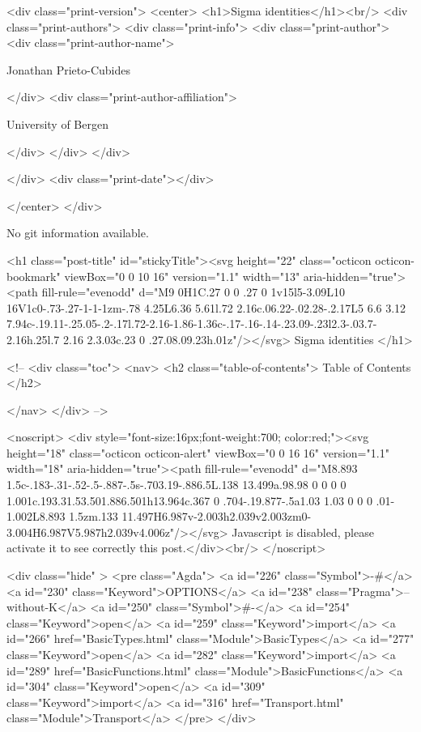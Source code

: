   <div class="print-version">
    <center>
      <h1>Sigma identities</h1><br/>
        <div class="print-authors">
          <div class="print-info">
            <div class="print-author">
              <div class="print-author-name">
                
                  Jonathan Prieto-Cubides
                
              </div>
              <div class="print-author-affiliation">
                
                  University of Bergen
                
                </div>
            </div>
          </div>
          
          
        </div>
        <div class="print-date"></div>
        
        
    </center>
  </div>

  
  No git information available.
  
  <h1 class="post-title" id="stickyTitle"><svg height="22" class="octicon octicon-bookmark" viewBox="0 0 10 16" version="1.1" width="13" aria-hidden="true"><path fill-rule="evenodd" d="M9 0H1C.27 0 0 .27 0 1v15l5-3.09L10 16V1c0-.73-.27-1-1-1zm-.78 4.25L6.36 5.61l.72 2.16c.06.22-.02.28-.2.17L5 6.6 3.12 7.94c-.19.11-.25.05-.2-.17l.72-2.16-1.86-1.36c-.17-.16-.14-.23.09-.23l2.3-.03.7-2.16h.25l.7 2.16 2.3.03c.23 0 .27.08.09.23h.01z"/></svg> Sigma identities
  </h1>

  <!-- 
  <div class="toc">
    <nav>
    <h2 class="table-of-contents"> Table of Contents </h2>
      

    </nav>
  </div>
   -->

  <noscript>
  <div style="font-size:16px;font-weight:700; color:red;"><svg height="18" class="octicon octicon-alert" viewBox="0 0 16 16" version="1.1" width="18" aria-hidden="true"><path fill-rule="evenodd" d="M8.893 1.5c-.183-.31-.52-.5-.887-.5s-.703.19-.886.5L.138 13.499a.98.98 0 0 0 0 1.001c.193.31.53.501.886.501h13.964c.367 0 .704-.19.877-.5a1.03 1.03 0 0 0 .01-1.002L8.893 1.5zm.133 11.497H6.987v-2.003h2.039v2.003zm0-3.004H6.987V5.987h2.039v4.006z"/></svg> Javascript is disabled, please activate it to see correctly this post.</div><br/>
  </noscript>

  <div class="hide" >
<pre class="Agda">
<a id="226" class="Symbol">{-#</a> <a id="230" class="Keyword">OPTIONS</a> <a id="238" class="Pragma">--without-K</a> <a id="250" class="Symbol">#-}</a>
<a id="254" class="Keyword">open</a> <a id="259" class="Keyword">import</a> <a id="266" href="BasicTypes.html" class="Module">BasicTypes</a>
<a id="277" class="Keyword">open</a> <a id="282" class="Keyword">import</a> <a id="289" href="BasicFunctions.html" class="Module">BasicFunctions</a>
<a id="304" class="Keyword">open</a> <a id="309" class="Keyword">import</a> <a id="316" href="Transport.html" class="Module">Transport</a>
</pre>
</div>

